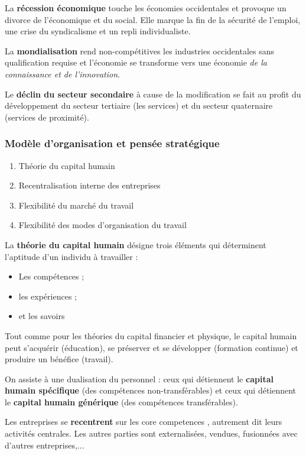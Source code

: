 \documentclass[12pt]{article}
\begin{document}
		La \textbf{récession économique} touche les économies occidentales et provoque un divorce de l'économique et du social. Elle marque la fin de la sécurité de l'emploi, une crise du syndicalisme et un repli individualiste.
		
		La \textbf{mondialisation} rend non-compétitives les industries occidentales sans qualification requise et l'économie se transforme vers une économie \emph{de la connaissance et de l'innovation}.
		
		Le \textbf{déclin du secteur secondaire} à cause de la modification se fait au profit du développement du secteur tertiaire (les services) et du secteur quaternaire (services de proximité).
		
		\subsubsection{Modèle d’organisation et pensée stratégique}
		
		\begin{enumerate}
		 \item Théorie du capital humain
		 \item Recentralisation interne des entreprises
		 \item Flexibilité du marché du travail
		 \item Flexibilité des modes d'organisation du travail
		\end{enumerate}
		
		La \textbf{théorie du capital humain} désigne trois éléments qui déterminent l'aptitude d'un individu à travailler :
		
		\begin{itemize}
		 \item Les compétences ;
		 \item les expériences ;
		 \item et les savoirs
		\end{itemize}
		
		Tout comme pour les théories du capital financier et physique, le capital humain peut s'acquérir (éducation), se préserver et se développer (formation continue) et produire un bénéfice (travail).
		
		On assiste à une dualisation du personnel : ceux qui détiennent le \textbf{capital humain spécifique} (des compétences non-transférables) et ceux qui détiennent le \textbf{capital humain générique} (des compétences transférables).
		
		Les entreprises se \textbf{recentrent} sur les \og{} core competences \fg{}, autrement dit leurs activités centrales. Les autres parties sont externalisées, vendues, fusionnées avec d'autres entreprises,...
		
\end{document}
